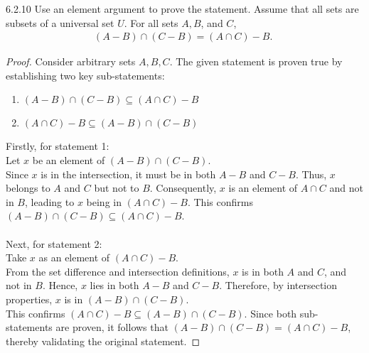 \begin{question}
    {6.2.10}
    {
        Use an element argument to prove the statement.
        Assume that all sets are subsets of a universal set $U$.
        For all sets $A, B$, and $C$,
        \begin{align*}
            (A-B) \cap(C-B)=(A \cap C)-B \text{. }
        \end{align*}
        \vspace{-\baselineskip}
    }
\end{question}
\begin{proof}
    Consider arbitrary sets \(A, B, C\). The given statement is proven true by establishing two key sub-statements:
    \begin{enumerate}
        \item[1.] \((A - B) \cap (C - B) \subseteq (A \cap C) - B\)
        \item[2.] \((A \cap C) - B \subseteq (A - B) \cap (C - B)\)
    \end{enumerate}
    Firstly, for statement 1: \\
    Let \(x\) be an element of \((A - B) \cap (C - B)\). \\
    Since \(x\) is in the intersection, it must be in both \(A - B\) and \(C - B\). Thus, \(x\) belongs to \(A\) and \(C\) but not to \(B\). Consequently, \(x\) is an element of \(A \cap C\) and not in \(B\), leading to \(x\) being in \((A \cap C) - B\). This confirms \((A - B) \cap (C - B) \subseteq (A \cap C) - B\). \\ \\
    Next, for statement 2: \\
    Take \(x\) as an element of \((A \cap C) - B\). \\
    From the set difference and intersection definitions, \(x\) is in both \(A\) and \(C\), and not in \(B\). Hence, \(x\) lies in both \(A - B\) and \(C - B\). Therefore, by intersection properties, \(x\) is in \((A - B) \cap (C - B)\). \\
    This confirms \((A \cap C) - B \subseteq (A - B) \cap (C - B)\).
    Since both sub-statements are proven, it follows that \((A - B) \cap (C - B) = (A \cap C) - B\), thereby validating the original statement.
\end{proof}

